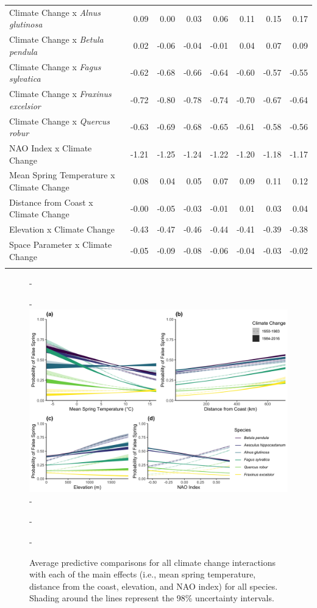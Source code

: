 \documentclass{article}\usepackage[]{graphicx}\usepackage[]{color}
\begin{document}
\begin{longtable}{lrrrrrrr}
  Climate Change
x\textit{ Alnus glutinosa} & 0.09 & 0.00 & 0.03 & 0.06 & 0.11 & 0.15 & 0.17 \\ 
  Climate Change
x\textit{ Betula pendula} & 0.02 & -0.06 & -0.04 & -0.01 & 0.04 & 0.07 & 0.09 \\ 
  Climate Change
x\textit{ Fagus sylvatica} & -0.62 & -0.68 & -0.66 & -0.64 & -0.60 & -0.57 & -0.55 \\ 
  Climate Change
x\textit{ Fraxinus excelsior} & -0.72 & -0.80 & -0.78 & -0.74 & -0.70 & -0.67 & -0.64 \\ 
  Climate Change
x\textit{ Quercus robur} & -0.63 & -0.69 & -0.68 & -0.65 & -0.61 & -0.58 & -0.56 \\ 
  NAO Index x Climate Change & -1.21 & -1.25 & -1.24 & -1.22 & -1.20 & -1.18 & -1.17 \\ 
  Mean Spring 
Temperature x Climate Change & 0.08 & 0.04 & 0.05 & 0.07 & 0.09 & 0.11 & 0.12 \\ 
  Distance from 
Coast x Climate Change & -0.00 & -0.05 & -0.03 & -0.01 & 0.01 & 0.03 & 0.04 \\ 
  Elevation x Climate Change & -0.43 & -0.47 & -0.46 & -0.44 & -0.41 & -0.39 & -0.38 \\ 
  Space Parameter x Climate Change & -0.05 & -0.09 & -0.08 & -0.06 & -0.04 & -0.03 & -0.02 \\ 
   \hline
\hline
\label{tab:suppmodlongtemps}
\end{longtable}


{\begin{figure} [H]
  -\begin{center}
  -\includegraphics[width=16cm]{..//..//analyses/figures/APC_allpred_allspp_baseR_long98.png}
  -\caption{Average predictive comparisons for all climate change interactions with each of the main effects (i.e., mean spring temperature, distance from the coast, elevation, and NAO index) for all species. Shading around the lines represent the 98\% uncertainty intervals. }\label{fig:suppapc}
  -\end{center}
  -\end{figure}}
  
\end{document}

